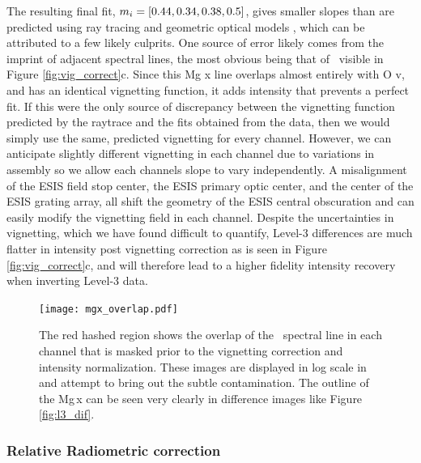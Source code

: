         The resulting final fit, $m_i = [0.44, 0.34, 0.38, 0.5]$, gives smaller slopes than are predicted using ray tracing and geometric optical models \citep{ESIS}, which can be attributed to a few likely culprits. 
        One source of error likely comes from the imprint of adjacent spectral lines, the most obvious being that of \mgxdim \ visible in Figure \ref{fig:vig_correct}c.
        Since this Mg {\sc x} line overlaps almost entirely with O {\sc v}, and has an identical vignetting function, it adds intensity that prevents a perfect fit. 
        If this were the only source of discrepancy between the vignetting function predicted by the raytrace and the fits obtained from the data, then we would simply use the same, predicted vignetting for every channel. 
        However, we can anticipate slightly different vignetting in each channel due to variations in assembly so we allow each channels slope to vary independently.
        A misalignment of the ESIS field stop center, the ESIS primary optic center, and the center of the ESIS grating array, all shift the geometry of the ESIS central obscuration and can easily modify the vignetting field in each channel.
        Despite the uncertainties in vignetting, which we have found difficult to quantify, Level-3 differences are much flatter in intensity post vignetting correction as is seen in Figure \ref{fig:vig_correct}c, and will therefore lead to a higher fidelity intensity recovery when inverting Level-3 data.

        
  
        
        \begin{figure}[htb!]
        	\centering
        	\texttt{[image: mgx\_overlap.pdf]}
        	\caption{The red hashed region shows the overlap of the \mgxbright \ spectral line in each channel that is masked prior to the vignetting correction and intensity normalization. These images are displayed in log scale in and attempt to bring out the subtle contamination.  The outline of the Mg\,{\sc x} can be seen very clearly in difference images like Figure \ref{fig:l3_dif}. }

        	\label{fig:mgx_overlap}
        \end{figure}
        
        

        
    \subsubsection{Relative Radiometric correction }
        
